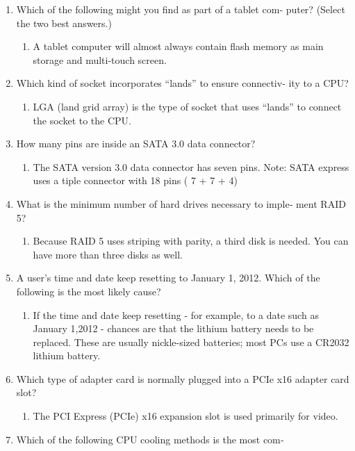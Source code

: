 \documentclass{article}
\begin{document}
\begin{enumerate}
    \item Which of the following might you find as part of a tablet com‐
puter? (Select the two best answers.)   
    \begin{enumerate}
        \item A tablet computer will almost always  contain flash memory as main storage and multi-touch screen. 
    \end{enumerate}
    \item Which kind of socket incorporates “lands” to ensure connectiv‐
ity to a CPU? 
    \begin{enumerate}
        \item LGA (land grid array) is the type of socket that
uses “lands” to connect the socket to the CPU.
    \end{enumerate}
    \item How many pins are inside an SATA 3.0 data connector? 
    \begin{enumerate}
        \item The SATA version 3.0 data connector has seven pins. Note: SATA express uses a tiple connector with 18 pins ( 7 + 7 + 4) 
    \end{enumerate}
    \item What is the minimum number of hard drives necessary to imple‐
ment RAID 5?
    \begin{enumerate}
        \item Because RAID 5 uses striping with parity, a third disk is needed. You can have more than three disks as well. 
    \end{enumerate}
    \item A user’s time and date keep resetting to January 1, 2012. Which
of the following is the most likely cause?
    \begin{enumerate}
        \item If the time and date keep resetting - for example, to a date such as January 1,2012 - chances are that the lithium battery needs to be replaced. These are usually nickle-sized batteries; most PCs use a CR2032 lithium battery. 
    \end{enumerate}
    \item Which type of adapter card is normally plugged into a PCIe x16
adapter card slot?
    \begin{enumerate}
        \item The PCI Express (PCIe) x16 expansion slot is used
primarily for video.
    \end{enumerate}
    \item Which of the following CPU cooling methods is the most com‐

\end{enumerate}
\end{document}
